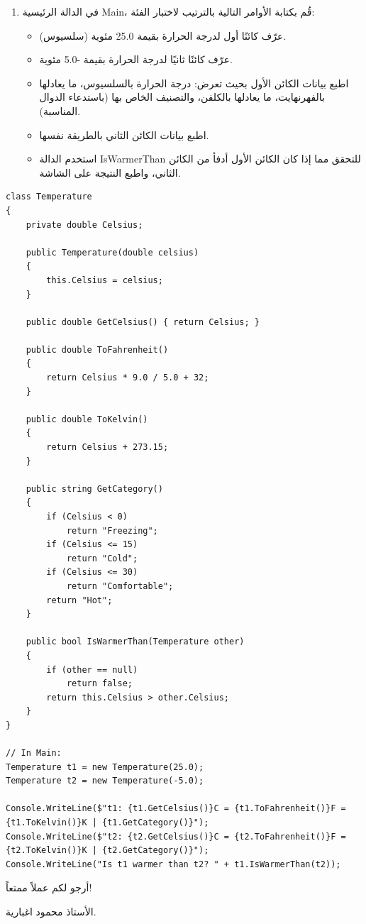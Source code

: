 \documentclass[14pt]{extarticle}
\begin{document}
\begin{enumerate}[itemsep=2em]
\begin{enumerate}[itemsep=1em]
    \item في الدالة الرئيسية \textenglish{Main}، قُم بكتابة الأوامر التالية بالترتيب لاختبار الفئة:
    \begin{itemize}[itemsep=1pt]
        \item عرّف كائنًا أول لدرجة الحرارة بقيمة \textenglish{25.0} مئوية (سلسيوس).
        \item عرّف كائنًا ثانيًا لدرجة الحرارة بقيمة \textenglish{-5.0} مئوية.
        \item اطبع بيانات الكائن الأول بحيث تعرض: درجة الحرارة بالسلسيوس، ما يعادلها بالفهرنهايت، ما يعادلها بالكلفن، والتصنيف الخاص بها (باستدعاء الدوال المناسبة).
        \item اطبع بيانات الكائن الثاني بالطريقة نفسها.
        \item استخدم الدالة \textenglish{IsWarmerThan} للتحقق مما إذا كان الكائن الأول أدفأ من الكائن الثاني، واطبع النتيجة على الشاشة.
    \end{itemize}
\end{enumerate}

\ifwithsols
\begin{boxSolution}
\begin{english}
\begin{verbatim}
class Temperature
{
    private double Celsius;

    public Temperature(double celsius)
    {
        this.Celsius = celsius;
    }

    public double GetCelsius() { return Celsius; }

    public double ToFahrenheit()
    {
        return Celsius * 9.0 / 5.0 + 32;
    }

    public double ToKelvin()
    {
        return Celsius + 273.15;
    }

    public string GetCategory()
    {
        if (Celsius < 0)
            return "Freezing";
        if (Celsius <= 15)
            return "Cold";
        if (Celsius <= 30)
            return "Comfortable";
        return "Hot";
    }

    public bool IsWarmerThan(Temperature other)
    {
        if (other == null)
            return false;
        return this.Celsius > other.Celsius;
    }
}

// In Main:
Temperature t1 = new Temperature(25.0);
Temperature t2 = new Temperature(-5.0);

Console.WriteLine($"t1: {t1.GetCelsius()}C = {t1.ToFahrenheit()}F = {t1.ToKelvin()}K | {t1.GetCategory()}");
Console.WriteLine($"t2: {t2.GetCelsius()}C = {t2.ToFahrenheit()}F = {t2.ToKelvin()}K | {t2.GetCategory()}");
Console.WriteLine("Is t1 warmer than t2? " + t1.IsWarmerThan(t2));
\end{verbatim}
\end{english}
\end{boxSolution}
\fi
\clearpage


\end{enumerate}

\vspace{1cm}
\begin{flushleft}
أرجو لكم عملاً ممتعاً!

الأستاذ محمود اغبارية.
\end{flushleft}
\end{document}
